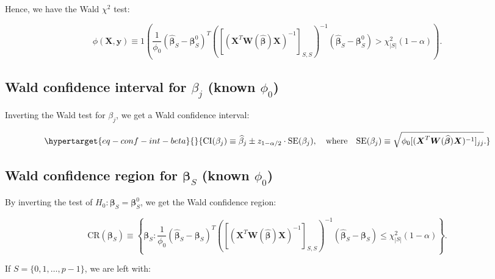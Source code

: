 \documentclass[
  11pt,
  letterpaper,
  oneside]{book}
\theoremstyle{plain}
\theoremstyle{plain}
\theoremstyle{definition}
\theoremstyle{definition}
\theoremstyle{plain}
\theoremstyle{remark}
\begin{document}
Hence, we have the Wald \(\chi^2\) test:

\[
\phi(\boldsymbol{X}, \boldsymbol{y}) \equiv 1\left(\frac{1}{\phi_0} (\boldsymbol{\widehat \beta}_S - \boldsymbol{\beta}_S^0)^T \left([(\boldsymbol{X}^T \boldsymbol{W}(\boldsymbol{\widehat \beta}) \boldsymbol{X})^{-1}]_{S,S}\right)^{-1}(\boldsymbol{\widehat \beta}_S - \boldsymbol{\beta}_S^0) > \chi^2_{|S|}(1-\alpha)\right).
\]

\hypertarget{sec-wald-ci-single-coeff}{%
\subsection{\texorpdfstring{Wald confidence interval for \(\beta_j\)
(known
\(\phi_0\))}{Wald confidence interval for \textbackslash beta\_j (known \textbackslash phi\_0)}}\label{sec-wald-ci-single-coeff}}

Inverting the Wald test for \(\beta_j\), we get a Wald confidence
interval:

\begin{equation}\protect\hypertarget{eq-conf-int-beta}{}{
\text{CI}(\beta_j) \equiv \widehat \beta_j \pm z_{1-\alpha/2} \cdot \text{SE}(\beta_j), \quad \text{where} \quad \text{SE}(\beta_j) \equiv \sqrt{\phi_0[(\boldsymbol{X}^T \boldsymbol{W}(\boldsymbol{\widehat \beta}) \boldsymbol{X})^{-1}]_{jj}}.
}\label{eq-conf-int-beta}\end{equation}

\hypertarget{sec-wald-cr-group-coeff}{%
\subsection{\texorpdfstring{Wald confidence region for
\(\boldsymbol{\beta}_S\) (known
\(\phi_0\))}{Wald confidence region for \textbackslash boldsymbol\{\textbackslash beta\}\_S (known \textbackslash phi\_0)}}\label{sec-wald-cr-group-coeff}}

By inverting the test of
\(H_0: \boldsymbol{\beta}_S = \boldsymbol{\beta}_S^0\), we get the Wald
confidence region:

\[
\text{CR}(\boldsymbol{\beta}_S) \equiv \left\{\boldsymbol{\beta}_S: \frac{1}{\phi_0} (\boldsymbol{\widehat \beta}_S - \boldsymbol{\beta}_S)^T \left([(\boldsymbol{X}^T \boldsymbol{W}(\boldsymbol{\widehat \beta}) \boldsymbol{X})^{-1}]_{S,S}\right)^{-1}(\boldsymbol{\widehat \beta}_S - \boldsymbol{\beta}_S) \leq \chi^2_{|S|}(1-\alpha)\right\}.
\]

If \(S = \{0, 1, \dots, p-1\}\), we are left with:
\end{document}
